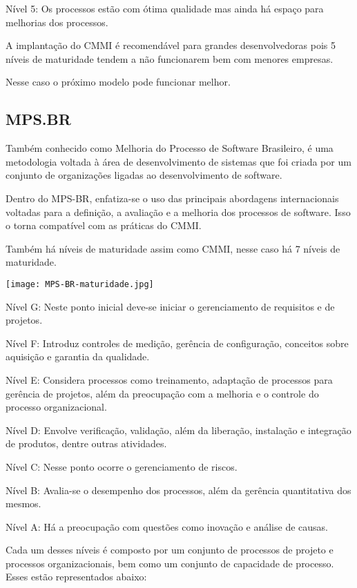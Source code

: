 \documentclass{article}
\begin{document}
Nível 5: Os processos estão com ótima qualidade
mas ainda há espaço para melhorias dos processos.

A implantação do CMMI é recomendável para grandes desenvolvedoras
pois 5 níveis de maturidade tendem a não funcionarem bem
com menores empresas. 

Nesse caso o próximo modelo pode funcionar melhor.

\subsection*{MPS.BR}
Também conhecido como Melhoria do Processo de Software Brasileiro,
é uma metodologia voltada à área de desenvolvimento de sistemas que foi criada
por um conjunto de organizações ligadas ao desenvolvimento de software.

Dentro do MPS-BR, enfatiza-se o uso das principais
abordagens internacionais voltadas para a definição, a avaliação e a
melhoria dos processos de software. Isso o torna compatível com as práticas do CMMI.

Também há níveis de maturidade assim como CMMI, 
nesse caso há 7 níveis de maturidade.

\begin{center}
    \texttt{[image: MPS-BR-maturidade.jpg]}
\end{center}

Nível G: Neste ponto inicial deve-se iniciar o
gerenciamento de requisitos e de projetos.

Nível F: Introduz controles de medição, gerência de
configuração, conceitos sobre aquisição e garantia da qualidade.

Nível E: Considera processos como treinamento,
adaptação de processos para gerência de projetos, 
além da preocupação com a melhoria e o controle do processo organizacional.

Nível D: Envolve verificação, validação, além da 
liberação, instalação e integração de produtos, dentre outras atividades.

Nível C: Nesse ponto ocorre o gerenciamento de riscos.

Nível B: Avalia-se o desempenho dos processos,
além da gerência quantitativa dos mesmos.

Nível A: Há a preocupação com questões como inovação
e análise de causas.

\newpage
\thispagestyle{headings}
Cada um desses níveis é composto por um conjunto
de processos de projeto e processos organizacionais,
bem como um conjunto de capacidade de processo.
Esses estão representados abaixo:
\end{document}
